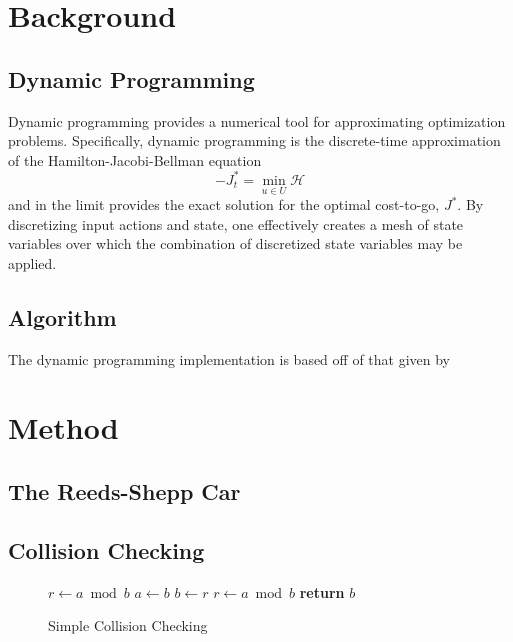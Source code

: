\documentclass[twocolumn,letterpaper]{IEEEAerospaceCLS}  %
\begin{document}
\tableofcontents

\section{Background}
\cite{LaValle1}



\subsection{Dynamic Programming}

Dynamic programming provides a numerical tool for approximating optimization problems. Specifically, dynamic programming is the discrete-time approximation of the Hamilton-Jacobi-Bellman equation
\[ -J^*_t = \min_{{u \in U}} \mathcal{H} \]
and in the limit provides the exact solution for the optimal cost-to-go, $J^*$. By discretizing input actions and state, one effectively creates a mesh of state variables over which the combination of discretized state variables may be applied. \cite{Hall2018}

\subsection{Algorithm}

The dynamic programming implementation is based off of that given by 





\section{Method}
\subsection{The Reeds-Shepp Car}


\subsection{Collision Checking}

\begin{figure}[!htb]
	\begin{algorithmic}[1]
		\State $r\gets a\bmod b$
		\State $a\gets b$
		\State $b\gets r$
		\State $r\gets a\bmod b$
		\EndWhile\label{euclidendwhile}
		\State \textbf{return} $b$
		\EndProcedure
	\end{algorithmic}
	\caption{Simple Collision Checking}\label{euclid}
\end{figure}
\end{document}
